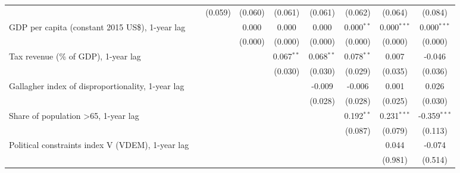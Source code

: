 \begin{table}[htbp]
\begin{tabular}{lcccccccc}
                                                                            &              & (0.059)       & (0.060)       & (0.061)        & (0.061)        & (0.062)        & (0.064)        & (0.084)\\   
      GDP per capita (constant 2015 US\$), 1-year lag                       &              &               & 0.000         & 0.000          & 0.000          & 0.000$^{**}$   & 0.000$^{***}$  & 0.000$^{***}$\\   
                                                                            &              &               & (0.000)       & (0.000)        & (0.000)        & (0.000)        & (0.000)        & (0.000)\\   
      Tax revenue (\% of GDP), 1-year lag                                   &              &               &               & 0.067$^{**}$   & 0.068$^{**}$   & 0.078$^{**}$   & 0.007          & -0.046\\   
                                                                            &              &               &               & (0.030)        & (0.030)        & (0.029)        & (0.035)        & (0.036)\\   
      Gallagher index of disproportionality, 1-year lag                     &              &               &               &                & -0.009         & -0.006         & 0.001          & 0.026\\   
                                                                            &              &               &               &                & (0.028)        & (0.028)        & (0.025)        & (0.030)\\   
      Share of population >65, 1-year lag                                   &              &               &               &                &                & 0.192$^{**}$   & 0.231$^{***}$  & -0.359$^{***}$\\   
                                                                            &              &               &               &                &                & (0.087)        & (0.079)        & (0.113)\\   
      Political constraints index V (VDEM), 1-year lag                      &              &               &               &                &                &                & 0.044          & -0.074\\   
                                                                            &              &               &               &                &                &                & (0.981)        & (0.514)\\   

\end{tabular}
\end{table}
